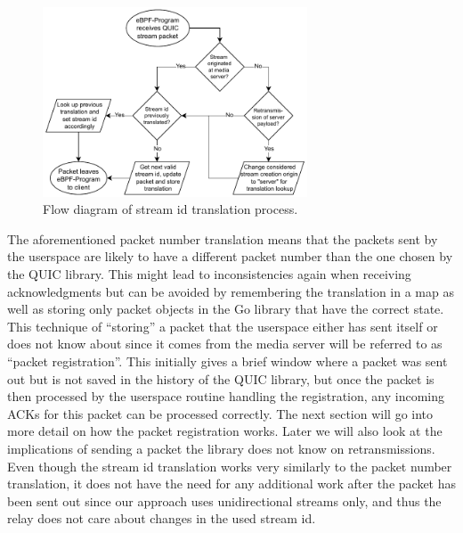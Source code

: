 \vspace{0.5cm}
\begin{figure}[H]
    \centering
    \includegraphics[width=0.7\textwidth]{figures/03_fast_relays/stream-id-translation.drawio.pdf}
    \caption[Stream id translation schematic]{Flow diagram of stream id translation process.}\label{fig:stream-id-translation}
\end{figure}
The aforementioned packet number translation means that the packets sent by the userspace are 
likely to have a different packet number than the one chosen by the QUIC library.
This might lead to inconsistencies again when receiving acknowledgments but can be avoided by 
remembering the translation in a map as well as storing only packet objects in the 
Go library that have the correct state.
This technique of ``storing'' a packet that the userspace either has sent itself or does not know
about since it comes from the media server will be referred to as ``packet registration''.
This initially gives a brief window where a packet was sent out but is not saved in the history
of the QUIC library, but once the packet is then processed by the userspace routine handling the 
registration, any incoming ACKs for this packet can be processed correctly.
The next section will go into more detail on how the packet registration works.
Later we will also look at the implications of sending a packet the library does not know on 
retransmissions.
Even though the stream id translation works very similarly to the packet number translation, it 
does not have the need for any additional work after the packet has been sent out since our 
approach uses unidirectional streams only, and thus the relay does not care about changes in 
the used stream id. %

